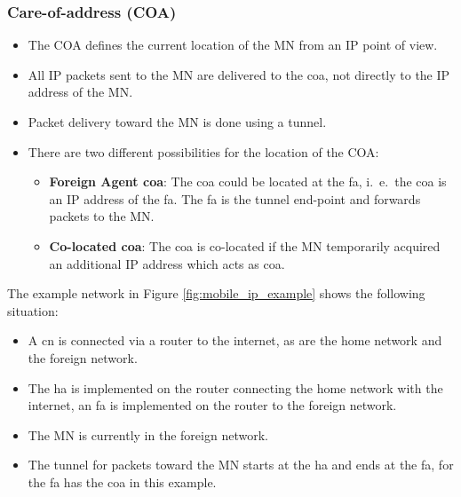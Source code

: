 \subsubsection[Care-of-address]{Care-of-address (COA)}
\begin{itemize}
	\item The COA defines the current location of the MN from an IP point of view. 
	\item All IP packets sent to the MN are delivered to the
	\gls{coa}, not directly to the IP address of the MN. 
	\item Packet delivery toward the MN is done using a tunnel.
	\item There are two different possibilities for the location of the COA:
	
	\begin{itemize}
		\item \textbf{Foreign Agent \gls{coa}}: The \gls{coa} could be located at the \gls{fa}, i.\ e.\, the \gls{coa} is an IP address of the \gls{fa}. The \gls{fa} is the tunnel end-point and forwards packets to the MN.
		\item \textbf{Co-located \gls{coa}}: The \gls{coa} is co-located if the MN temporarily acquired an additional IP address which acts as \gls{coa}. 
	\end{itemize}
\end{itemize}


The example network in Figure \ref{fig:mobile_ip_example} shows the following situation: 
\begin{itemize}
	\item A \gls{cn} is connected via a router to the internet, as are the home network and the foreign network. 
	\item The \gls{ha} is implemented on the router connecting the home network with the internet, an \gls{fa} is implemented on the router to the foreign network.
	\item The MN is currently in the foreign network. 
	\item The tunnel for packets toward the MN starts at the \gls{ha} and ends at the \gls{fa}, for the \gls{fa} has the \gls{coa} in this example.
\end{itemize}


